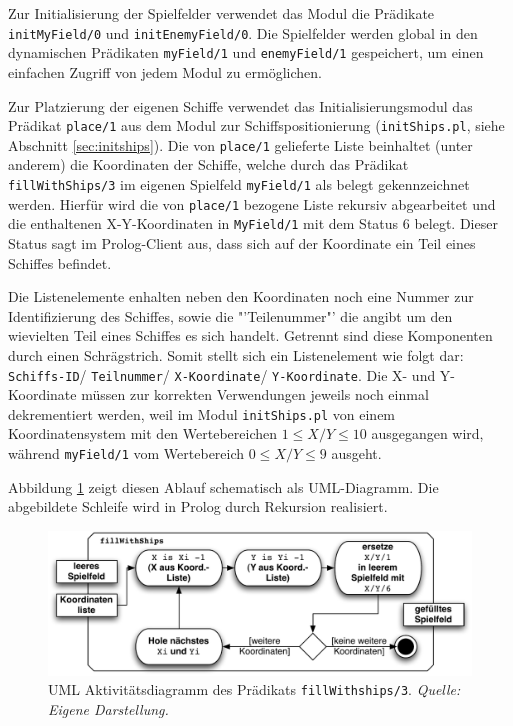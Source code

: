 	Zur Initialisierung der Spielfelder verwendet das Modul die Prädikate \texttt{initMyField/0} und \texttt{initEnemyField/0}.
	Die Spielfelder werden global in den dynamischen Prädikaten \texttt{myField/1} und \texttt{enemyField/1}
	gespeichert, um einen einfachen Zugriff von jedem Modul zu ermöglichen. 
	
	Zur Platzierung der eigenen Schiffe verwendet das Initialisierungsmodul das Prädikat \texttt{place/1} aus dem Modul zur 
	Schiffspositionierung (\texttt{initShips.pl}, siehe Abschnitt \ref{sec:initships}).
	Die von \texttt{place/1} gelieferte Liste beinhaltet (unter anderem) die Koordinaten der Schiffe, welche durch das Prädikat 
	\texttt{fillWithShips/3} im eigenen Spielfeld \texttt{myField/1} als belegt gekennzeichnet werden. Hierfür wird 
	die von \texttt{place/1} bezogene Liste rekursiv abgearbeitet und die enthaltenen X-Y-Koordinaten in \texttt{MyField/1} mit dem 
	Status 6 belegt. Dieser Status sagt im Prolog-Client aus, dass sich auf der Koordinate ein Teil eines Schiffes befindet.
	
	Die Listenelemente enhalten neben den Koordinaten noch eine Nummer zur Identifizierung des Schiffes, sowie die "'Teilenummer"' 
	die angibt um den wievielten Teil eines Schiffes es sich handelt. Getrennt sind diese Komponenten durch einen Schrägstrich. Somit 
	stellt sich ein Listenelement wie folgt dar: \texttt{Schiffs-ID}/ \texttt{Teilnummer}/ \texttt{X-Koordinate}/ \texttt{Y-Koordinate}.
	Die X- und Y-Koordinate müssen zur korrekten Verwendungen jeweils noch einmal dekrementiert werden, weil im Modul \texttt{initShips.pl} von 
	einem Koordinatensystem mit den Wertebereichen $1\le X/Y\le 10$ ausgegangen wird, während \texttt{myField/1} vom Wertebereich $0\le X/Y\le 9$ ausgeht.
	
	Abbildung \ref{fig:fillwithShips3} zeigt diesen Ablauf schematisch als UML-Diagramm. Die abgebildete Schleife 
	wird in Prolog durch Rekursion realisiert.
	\begin{figure}[H] %
		\centering
		\includegraphics[width=.9\textwidth]{images/fillWithShips.pdf}
		\caption{UML Aktivitätsdiagramm des Prädikats \texttt{fillWithships/3}. \emph{Quelle: Eigene Darstellung.}}
		\label{fig:fillwithShips3}
	\end{figure}

